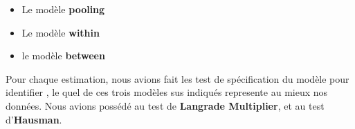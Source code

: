 \documentclass[
]{book}
\providecommand{\tightlist}{%
  \setlength{\itemsep}{0pt}\setlength{\parskip}{0pt}}
\begin{document}
\begin{itemize}
\tightlist
\item
  Le modèle \textbf{pooling}
\item
  Le modèle \textbf{within}
\item
  le modèle \textbf{between}
\end{itemize}

Pour chaque estimation, nous avions fait les test de spécification du modèle pour identifier , le quel de ces trois modèles sus indiqués represente au mieux nos données. Nous avions possédé au test de \textbf{Langrade Multiplier}, et au test d'\textbf{Hausman}.

  
\end{document}
